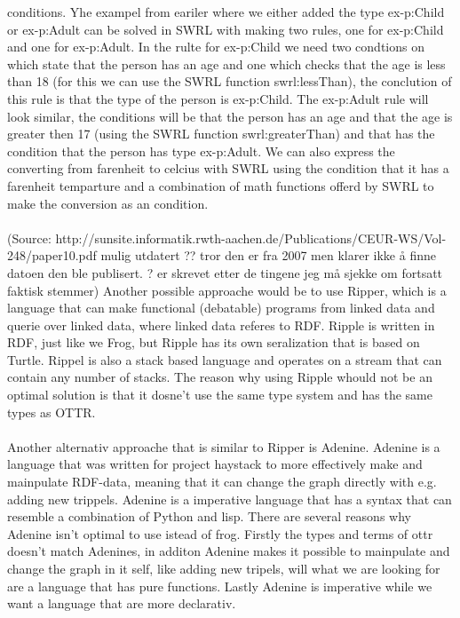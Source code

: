 conditions. Yhe exampel from eariler where we either added the type ex-p:Child or ex-p:Adult can be solved in SWRL with 
making two rules, one for ex-p:Child and one for ex-p:Adult. In the rulte for ex-p:Child we need two condtions on which 
state that the person has an age and one which checks that the age is less than 18 (for this we can use the SWRL function
swrl:lessThan), the conclution of this rule is that the type of the person is ex-p:Child. The ex-p:Adult rule will look 
similar, the conditions will be that the person has an age and that the age is greater then 17 (using the SWRL function 
swrl:greaterThan) and that has the condition that the person has type ex-p:Adult. We can also express the converting from farenheit
to celcius with SWRL using the condition that it has a farenheit temparture and a combination of math functions offerd by SWRL to 
make the conversion as an condition.
\\ \\
(Source: http://sunsite.informatik.rwth-aachen.de/Publications/CEUR-WS/Vol-248/paper10.pdf mulig utdatert ?? tror den er fra 2007 
men klarer ikke å finne datoen den ble publisert. ? er skrevet etter de tingene jeg må sjekke om fortsatt faktisk stemmer)
Another possible approache would be to use Ripper, which is a language that can make functional (debatable) programs from linked data
and querie over linked data, where linked data referes to RDF. 
Ripple is written in RDF, just like we Frog, but Ripple has its own seralization that is based on 
Turtle. Rippel is also a stack based language and operates on a stream that can contain any number of stacks.
The reason why using Ripple whould not be an optimal solution is that it dosne't use the same type system and has 
the same types as OTTR.   
\\ \\
Another alternativ approache that is similar to Ripper is Adenine. Adenine is a language that was written for project 
haystack to more effectively make and mainpulate RDF-data, meaning that it can change the graph directly with e.g. adding 
new trippels. 
Adenine is a imperative language that has a syntax that can resemble a combination of Python and lisp.
There are several reasons why Adenine isn't optimal to use istead of frog. Firstly the types and terms of 
ottr doesn't match Adenines, in additon Adenine makes it possible to mainpulate and change the graph in it self,
like adding new tripels, will what we are looking for are a language that has pure functions. Lastly Adenine is 
imperative while we want a language that are more declarativ. 
